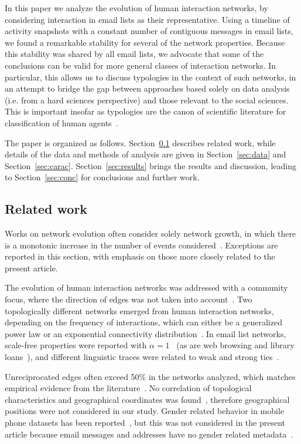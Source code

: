 \documentclass[%
 aip,
 jmp,%
 amsmath,amssymb,
 reprint,%
]{revtex4-1}
\begin{document}
In this paper we analyze the evolution of human interaction networks, by considering interaction in email lists as their representative. Using a timeline of activity snapshots with a constant number of contiguous messages in email lists, we found a remarkable stability for several of the network properties. Because this stability was shared by all email lists, we advocate that some of the conclusions can be valid for more general classes of interaction networks. In particular, this allows us to discuss typologies in the context of such networks, in an attempt to bridge the gap between approaches based solely on data analysis (i.e. from a hard sciences perspective) and those relevant to the social sciences. This is important insofar as typologies are the canon of scientific literature for classification of human agents~\cite{typCanon}. 

The paper is organized as follows. Section~\ref{sec:related} describes related work, while details of the data and methods of analysis are given in  Section~\ref{sec:data} and Section~\ref{sec:carac}. Section~\ref{sec:results} brings the results and discussion, leading to Section~\ref{sec:conc} for conclusions and further work. 

\subsection{Related work}\label{sec:related}
Works on network evolution often consider solely network growth, in which there is a monotonic increase in the number of events considered~\cite{barabasiEvo}. Exceptions are reported in this section, with emphasis on those more closely related to the present article.

The evolution of human interaction networks was addressed with a community focus, where the direction of edges was not taken into account~\cite{barabasiEvo}. Two topologically different networks emerged from human interaction networks, depending on the frequency of interactions, which can either be a generalized power law or an exponential connectivity distribution~\cite{barabasiTopologicalEv}. In email list networks, scale-free properties were reported with $\alpha=1$~\cite{bird} (as are web browsing and library loans~\cite{barabasiHumanDyn}), and different linguistic traces were related to weak and strong ties~\cite{GMANE2}.

Unreciprocated edges often exceed 50\% in the networks analyzed, which matches empirical evidence from the literature~\cite{newmanEvolving}. No correlation of topological characteristics and geographical coordinates was found~\cite{barabasiGeo}, therefore geographical positions were not considered in our study. Gender related behavior in mobile phone datasets has been reported~\cite{barabasiSex}, but this was not considered in the present article because email messages and addresses have no gender related metadata~\cite{GMANE}.
\end{document}
